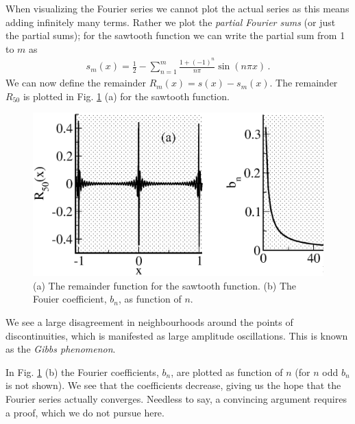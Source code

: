 When visualizing the Fourier series we cannot plot the actual series as this means adding 
infinitely many terms. Rather we plot the \emph{partial Fourier sums} (or just 
the partial sums); for the sawtooth function we can write the partial sum from 1 to $m$ as 
\begin{eqnarray}
	s_m(x) = \frac{1}{2} - \sum_{n=1}^m  \frac{1 + (-1)^n}{n \pi} \sin(n\pi x) \, .
\end{eqnarray}
We can now define the remainder $R_m(x) = s(x) - s_m(x)$. The remainder $R_{50}$ is plotted in Fig. 
\ref{fig:remainder-fourier} (a) for the sawtooth function. 
\begin{figure}[h]
	\begin{center}
		\includegraphics[scale=0.35]{figs/remainderFourier.eps}
		\caption{\label{fig:remainder-fourier}
			(a) The remainder function for the sawtooth function.
			(b) The Fouier coefficient, $b_n$, as function of $n$.
		}
	\end{center}
\end{figure}
We see a large disagreement in neighbourhoods around 
the points of discontinuities, which is manifested as large amplitude oscillations. This is known 
as the \emph{Gibbs phenomenon}. 

In Fig. \ref{fig:remainder-fourier} (b) the Fourier coefficients, $b_n$, are plotted as function of $n$ (for 
$n$ odd $b_n$ is not shown). We see that the coefficients decrease, giving us the hope that the Fourier series 
actually converges. Needless to say, a convincing argument requires a proof, which we do not pursue here. 


